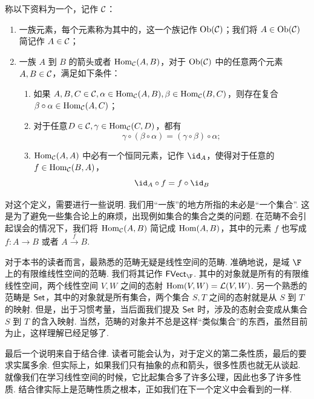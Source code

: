 \begin{definition}{}{}
    称以下资料为一个，记作 $\mathcal{C}$：
    \begin{enumerate}
        \item 一族元素，每个元素称为其中的，这一个族记作 $\operatorname{Ob}(\mathcal{C})$；我们将 $A \in \operatorname{Ob}(\mathcal{C})$ 简记作 $A \in \mathcal{C}$；
        \item 一族 $A$ 到 $B$ 的箭头或者 $\operatorname{Hom}_{\mathcal{C}} (A, B)$，对于 $\operatorname{Ob}(\mathcal{C})$ 中的任意两个元素 $A, B \in \mathcal{C}$，满足如下条件：
              \begin{enumerate}
                  \item 如果 $A, B, C \in \mathcal{C}, \alpha \in \operatorname{Hom}_{\mathcal{C}} (A, B), \beta \in \operatorname{Hom}_{\mathcal{C}} (B, C)$，则存在复合 $\beta \circ \alpha \in \operatorname{Hom}_{\mathcal{C}}(A, C)$；
                  \item 对于任意$D \in \mathcal{C}, \gamma \in \operatorname{Hom}_{\mathcal{C}} (C, D)$，都有\[
                            \gamma \circ (\beta \circ \alpha)= (\gamma \circ \beta) \circ \alpha;
                        \]
                  \item $\operatorname{Hom}_{\mathcal{C}} (A, A)$ 中必有一个恒同元素，记作 $\id_A$，使得对于任意的$f \in \operatorname{Hom}_{\mathcal{C}} (B, A)$，
                        \[\id_A \circ f = f \circ \id_B \]
              \end{enumerate}
    \end{enumerate}
\end{definition}

对这个定义，需要进行一些说明. 我们用``一族''的地方所指的未必是``一个集合''. 这是为了避免一些集合论上的麻烦，出现例如集合的集合之类的问题. 在范畴不会引起误会的情况下，我们将 $\operatorname{Hom}_{\mathcal{C}} (A, B)$ 简记成 $\operatorname{Hom} (A, B)$，其中的元素 $f$ 也写成 $f\colon A \to B$ 或者 $A \stackrel{f}{\to} B$.

对于本书的读者而言，最熟悉的范畴无疑是线性空间的范畴. 准确地说，是域 $\F$ 上的有限维线性空间的范畴. 我们将其记作 $\FVect_\F$. 其中的对象就是所有的有限维线性空间，两个线性空间 $V, W$ 之间的态射 $\operatorname{Hom} (V, W) = \mathcal{L}(V, W)$. 另一个熟悉的范畴是 $\mathsf{Set}$，其中的对象就是所有集合，两个集合 $S, T$ 之间的态射就是从 $S$ 到 $T$ 的映射. 但是，出于习惯考量，当后面我们提及 $\mathsf{Set}$ 时，涉及的态射会变成从集合 $S$ 到 $T$ 的含入映射. 当然，范畴的对象并不总是这样``类似集合''的东西，虽然目前为止，这样理解已经足够了.

最后一个说明来自于结合律. 读者可能会认为，对于定义的第二条性质，最后的要求实属多余. 但实际上，如果我们只有抽象的点和箭头，很多性质也就无从谈起. 就像我们在学习线性空间的时候，它比起集合多了许多公理，因此也多了许多性质. 结合律实际上是范畴性质之根本，正如我们在下一个定义中会看到的一样.

